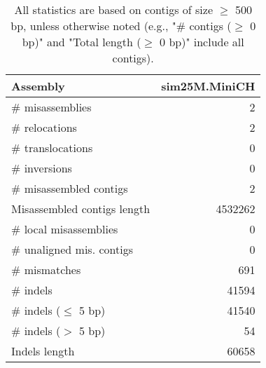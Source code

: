 \documentclass[12pt,a4paper]{article}
\begin{document}
\begin{table}[ht]
\begin{center}
\caption{All statistics are based on contigs of size $\geq$ 500 bp, unless otherwise noted (e.g., "\# contigs ($\geq$ 0 bp)" and "Total length ($\geq$ 0 bp)" include all contigs).}
\begin{tabular}{|l*{1}{|r}|}
\hline
Assembly & sim25M.MiniCH \\ \hline
\# misassemblies & 2 \\ \hline
\hspace{5mm}\# relocations & 2 \\ \hline
\hspace{5mm}\# translocations & 0 \\ \hline
\hspace{5mm}\# inversions & 0 \\ \hline
\# misassembled contigs & 2 \\ \hline
Misassembled contigs length & 4532262 \\ \hline
\# local misassemblies & 0 \\ \hline
\# unaligned mis. contigs & 0 \\ \hline
\# mismatches & 691 \\ \hline
\# indels & 41594 \\ \hline
\hspace{5mm}\# indels ($\leq$ 5 bp) & 41540 \\ \hline
\hspace{5mm}\# indels ($>$ 5 bp) & 54 \\ \hline
Indels length & 60658 \\ \hline
\end{tabular}
\end{center}
\end{table}
\end{document}
